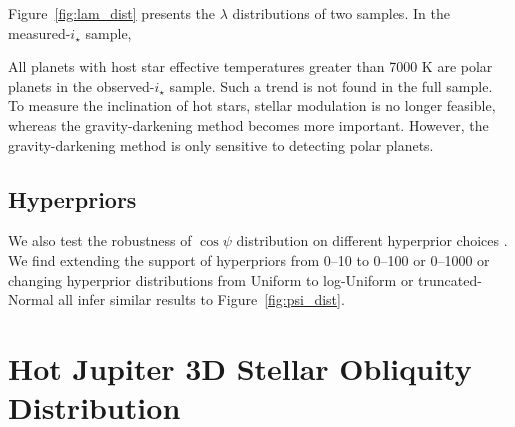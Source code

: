 \documentclass[twocolumn,times]{aastex631}
\begin{document}
Figure~\ref{fig:lam_dist} presents the $\lambda$ distributions of two samples. In the measured-$i_\star$ sample, 


All planets with host star effective temperatures greater than 7000 K are polar planets in the observed-$i_\star$ sample. Such a trend is not found in the full sample. To measure the inclination of hot stars, stellar modulation is no longer feasible, whereas the gravity-darkening method becomes more important. However, the gravity-darkening method is only sensitive to detecting polar planets.

\subsection{Hyperpriors}
We also test the robustness of $\cos{\psi}$ distribution on different hyperprior choices \citep[see a nice summary in][]{Nagpal22}. We find extending the support of hyperpriors from 0--10 to 0--100 or 0--1000 or changing hyperprior distributions from Uniform to log-Uniform or truncated-Normal all infer similar results to Figure~\ref{fig:psi_dist}.

\section{Hot Jupiter 3D Stellar Obliquity Distribution} \label{sec:hjs}


\end{document}
